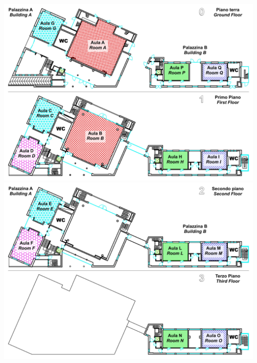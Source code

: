 \includegraphics[scale=0.55]{Belmeloro14_floor0_1.pdf}
\includegraphics[scale=0.55]{Belmeloro14_floor2_3.pdf}

